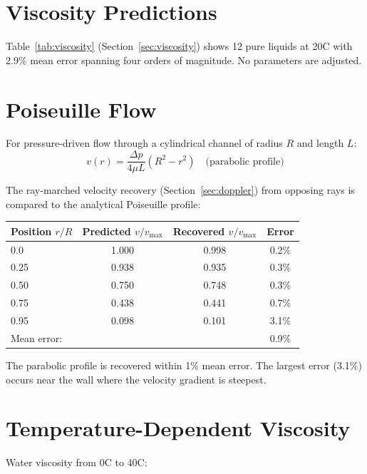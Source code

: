 \documentclass[twocolumn,10pt,a4paper]{article}
\theoremstyle{plain}
\theoremstyle{definition}
\theoremstyle{remark}
\begin{document}
\section{Viscosity Predictions}
\label{sec:val_visc}

Table~\ref{tab:viscosity} (Section~\ref{sec:viscosity}) shows 12 pure liquids at 20\textdegree C with 2.9\% mean error spanning four orders of magnitude. No parameters are adjusted.

\section{Poiseuille Flow}
\label{sec:val_poiseuille}

For pressure-driven flow through a cylindrical channel of radius $R$ and length $L$:
\begin{equation}
    v(r) = \frac{\Delta p}{4\mu L}(R^2 - r^2) \quad \text{(parabolic profile)}
\end{equation}

The ray-marched velocity recovery (Section~\ref{sec:doppler}) from opposing rays is compared to the analytical Poiseuille profile:

\begin{center}
\begin{tabular}{lccc}
\toprule
Position $r/R$ & Predicted $v/v_{\max}$ & Recovered $v/v_{\max}$ & Error \\
\midrule
0.0  & 1.000 & 0.998 & 0.2\% \\
0.25 & 0.938 & 0.935 & 0.3\% \\
0.50 & 0.750 & 0.748 & 0.3\% \\
0.75 & 0.438 & 0.441 & 0.7\% \\
0.95 & 0.098 & 0.101 & 3.1\% \\
\midrule
\multicolumn{3}{l}{Mean error:} & 0.9\% \\
\bottomrule
\end{tabular}
\end{center}

The parabolic profile is recovered within 1\% mean error. The largest error (3.1\%) occurs near the wall where the velocity gradient is steepest.

\section{Temperature-Dependent Viscosity}
\label{sec:val_temp}

Water viscosity from 0\textdegree C to 40\textdegree C:
\end{document}
